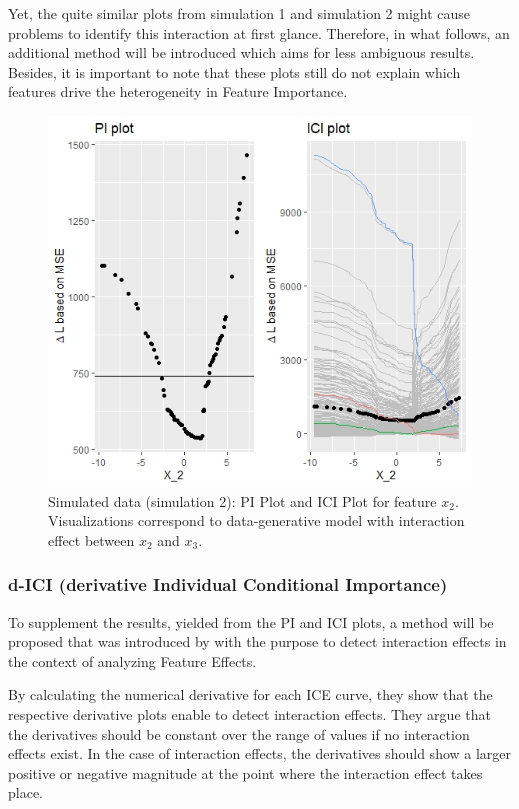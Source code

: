 \documentclass[
]{krantz}
\begin{document}
Yet, the quite similar plots from simulation 1 and simulation 2 might cause problems to identify this interaction at first glance. Therefore, in what follows, an additional method will be introduced which aims for less ambiguous results. Besides, it is important to note that these plots still do not explain which features drive the heterogeneity in Feature Importance.

\begin{figure}

{\centering \includegraphics[width=0.99\linewidth]{images/03-7-2} 

}

\caption{Simulated data (simulation 2): PI Plot and ICI Plot for feature $x_{2}$. Visualizations correspond to data-generative model with interaction effect between $x_{2}$ and $x_{3}$.}\label{fig:fig2}
\end{figure}

\hypertarget{ch312}{%
\subsubsection{d-ICI (derivative Individual Conditional Importance)}\label{ch312}}

To supplement the results, yielded from the PI and ICI plots, a method will be proposed that was introduced by \citet{Goldstein2013} with the purpose to detect interaction effects in the context of analyzing Feature Effects.

By calculating the numerical derivative for each ICE curve, they show that the respective derivative plots enable to detect interaction effects. They argue that the derivatives should be constant over the range of values if no interaction effects exist. In the case of interaction effects, the derivatives should show a larger positive or negative magnitude at the point where the interaction effect takes place.
\end{document}
